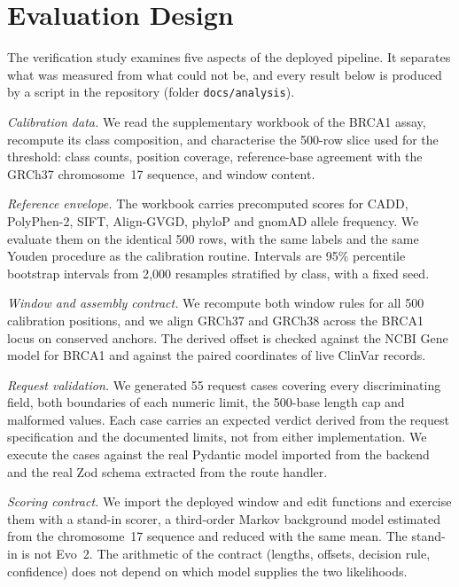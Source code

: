 \documentclass[10pt,journal,a4paper]{IEEEtran}
\begin{document}
\section{Evaluation Design}
\label{sec:design}

The verification study examines five aspects of the deployed pipeline. It separates what was measured from what could not be, and every result below is produced by a script in the repository (folder \texttt{docs/analysis}).

\textit{Calibration data.} We read the supplementary workbook of the BRCA1 assay, recompute its class composition, and characterise the 500-row slice used for the threshold: class counts, position coverage, reference-base agreement with the GRCh37 chromosome~17 sequence, and window content.

\textit{Reference envelope.} The workbook carries precomputed scores for CADD, PolyPhen-2, SIFT, Align-GVGD, phyloP and gnomAD allele frequency. We evaluate them on the identical 500 rows, with the same labels and the same Youden procedure as the calibration routine. Intervals are 95\% percentile bootstrap intervals from 2{,}000 resamples stratified by class, with a fixed seed.

\textit{Window and assembly contract.} We recompute both window rules for all 500 calibration positions, and we align GRCh37 and GRCh38 across the BRCA1 locus on conserved anchors. The derived offset is checked against the NCBI Gene model for BRCA1 and against the paired coordinates of live ClinVar records.

\textit{Request validation.} We generated 55 request cases covering every discriminating field, both boundaries of each numeric limit, the 500-base length cap and malformed values. Each case carries an expected verdict derived from the request specification and the documented limits, not from either implementation. We execute the cases against the real Pydantic model imported from the backend and the real Zod schema extracted from the route handler.

\textit{Scoring contract.} We import the deployed window and edit functions and exercise them with a stand-in scorer, a third-order Markov background model estimated from the chromosome~17 sequence and reduced with the same mean. The stand-in is not Evo~2. The arithmetic of the contract (lengths, offsets, decision rule, confidence) does not depend on which model supplies the two likelihoods.
\end{document}
